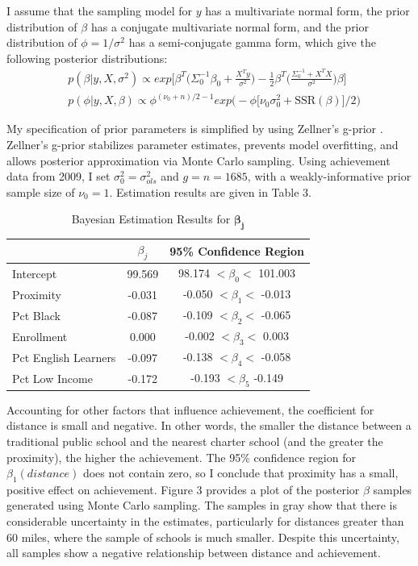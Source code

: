 \documentclass[11pt]{article}
\begin{document}
I assume that the sampling model for $y$ has a multivariate normal form, the prior distribution of $\beta$ has a conjugate multivariate normal form, and the prior distribution of $\phi=1/\sigma^2$ has a semi-conjugate gamma form, which give the following posterior distributions:
\begin{align*}
& p(\beta\vert y,X,\sigma^2)\propto exp\bigg[\beta^T\bigg(\Sigma_0^{-1}\beta_0+\frac{X^Ty}{\sigma^2}\bigg)-\frac{1}{2}\beta^T\bigg(\frac{\Sigma_0^{-1}+X^TX}{\sigma^2}\bigg)\beta\bigg]\\
& p(\phi\vert y,X,\beta) \propto \phi^{(\nu_0+n)/2-1}exp\big(-\phi\big[\nu_0\sigma_0^2+\text{SSR}(\beta)\big]/2\big)
\end{align*}

My specification of prior parameters is simplified by using Zellner's g-prior \citep{hoff09}.  Zellner's g-prior stabilizes parameter estimates, prevents model overfitting, and allows posterior approximation via Monte Carlo sampling.  Using achievement data from 2009, I set $\sigma_0^2=\sigma_{ols}^2$ and $g=n=1685$, with a weakly-informative prior sample size of $\nu_0=1$.  Estimation results are given in Table 3.

\begin{table}[h]
\centering
\caption{Bayesian Estimation Results for $\mathbf{\beta_j}$} 
\begin{tabular}{|l|c|c|}
  \hline
 & $\beta_j$ & 95\% Confidence Region \\ 
  \hline
Intercept & 99.569 & 98.174 $<\beta_0<$ 101.003 \\ 
   \hline
Proximity & -0.031 & -0.050 $<\beta_1<$ -0.013 \\ 
   \hline
Pct Black & -0.087 & -0.109 $<\beta_2<$ -0.065 \\ 
   \hline
Enrollment & 0.000 & -0.002 $<\beta_3<$ 0.003 \\ 
   \hline
Pct English Learners & -0.097 & -0.138 $<\beta_4<$ -0.058 \\ 
   \hline
Pct Low Income & -0.172 & -0.193 $<\beta_5$ -0.149 \\ 
   \hline
\end{tabular}
\end{table}

Accounting for other factors that influence achievement, the coefficient for distance is small and negative.  In other words, the smaller the distance between a traditional public school and the nearest charter school (and the greater the proximity), the higher the achievement.  The 95\% confidence region for $\beta_1(distance)$ does not contain zero, so I conclude that proximity has a small, positive effect on achievement.  Figure 3 provides a plot of the posterior $\beta$ samples generated using Monte Carlo sampling.  The samples in gray show that there is considerable uncertainty in the estimates, particularly for distances greater than 60 miles, where the sample of schools is much smaller.  Despite this uncertainty, all samples show a negative relationship between distance and achievement.
\end{document}
